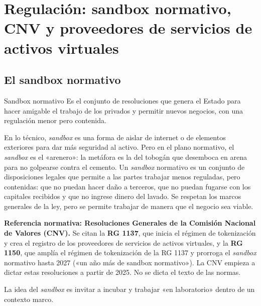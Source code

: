 \documentclass[12pt,oneside]{book}
\begin{document}
\chapter[Regulación: sandbox normativo, CNV y PSAV]{Regulación: sandbox normativo, CNV y proveedores de servicios de activos virtuales}

\section{El sandbox normativo}

\begin{definition}{Sandbox normativo}
Es el conjunto de resoluciones que genera el Estado para hacer amigable el trabajo de los privados y permitir nuevos negocios, con una regulación menor pero contenida.
\end{definition}

En lo técnico, \textit{sandbox} es una forma de aislar de internet o de elementos exteriores para dar más seguridad al activo. Pero en el plano normativo, el \textit{sandbox} es el «arenero»: la metáfora es la del tobogán que desemboca en arena para no golpearse contra el cemento. Un \textit{sandbox} normativo es un conjunto de disposiciones legales que permite a las partes trabajar menos reguladas, pero contenidas: que no puedan hacer daño a terceros, que no puedan fugarse con los capitales recibidos y que no ingrese dinero del lavado. Se respetan los marcos generales de la ley, pero se permite trabajar de manera que el negocio sea viable.

\begin{note}
\textbf{Referencia normativa: Resoluciones Generales de la Comisión Nacional de Valores (CNV).} Se citan la \textbf{RG 1137}, que inicia el régimen de tokenización y crea el registro de los proveedores de servicios de activos virtuales, y la \textbf{RG 1150}, que amplía el régimen de tokenización de la RG 1137 y prorroga el \textit{sandbox} normativo hasta 2027 («un año más de sandbox normativo»). La CNV empieza a dictar estas resoluciones a partir de 2025. No se dicta el texto de las normas.
\end{note}

La idea del \textit{sandbox} es invitar a incubar y trabajar «en laboratorio» dentro de un contexto marco.
\end{document}
